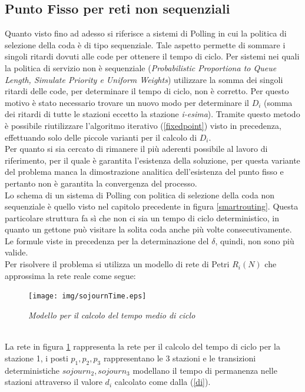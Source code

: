 \documentclass[12pt,a4paper,italian]{article}
\begin{document}
\subsection{Punto Fisso per reti non sequenziali}
Quanto visto fino ad adesso si riferisce a sistemi di Polling in cui la politica di selezione della coda è di tipo sequenziale. Tale aspetto permette di sommare i singoli ritardi dovuti alle code per ottenere il tempo di ciclo. Per sistemi nei quali la politica di servizio non è sequenziale (\emph{Probabilistic Proportiona to Queue Length, Simulate Priority e Uniform Weights}) utilizzare la somma dei singoli ritardi delle code, per determinare il tempo di ciclo, non è corretto. Per questo motivo è stato necessario trovare un nuovo modo per determinare il $D_i$ (somma dei ritardi di tutte le stazioni eccetto la stazione \emph{i-esima}). Tramite questo metodo è possibile riutilizzare l'algoritmo iterativo (\ref{fixedpoint}) visto in precedenza, effettuando solo delle piccole varianti per il calcolo di $D_i$.\\
Per quanto si sia cercato di rimanere il più aderenti possibile al lavoro di riferimento\cite{fixedpoint}, per il quale è garantita l'esistenza della soluzione, per questa variante del problema manca la dimostrazione analitica dell'esistenza del punto fisso e pertanto non è garantita la convergenza del processo.\\
\newline
Lo schema di un sistema di Polling con politica di selezione della coda non sequenziale è quello visto nel capitolo precedente in figura \ref{smartrouting}. Questa particolare struttura fa sì che non ci sia un tempo di ciclo deterministico, in quanto un gettone può visitare la solita coda anche più volte consecutivamente. Le formule viste in precedenza  per la determinazione del $\delta$, quindi, non sono più valide.\\ Per risolvere il problema si utilizza un modello di rete di Petri  $R_i(N)$ che approssima la rete reale come segue:
\begin{figure}[!ht]
	\centering
	\texttt{[image: img/sojournTime.eps]}
	\caption{\emph{Modello per il calcolo del tempo medio di ciclo}}
	\label{sojourn}
\end{figure}\\
La rete in figura \ref{sojourn} rappresenta la rete per il calcolo del tempo di ciclo per la stazione 1, i posti $p_1,p_2,p_3$ rappresentano le 3 stazioni e le transizioni deterministiche $sojourn_2,sojourn_3$ modellano il tempo di permanenza nelle stazioni attraverso il valore $d_i$ calcolato come dalla (\ref{di}).\\
\end{document}
